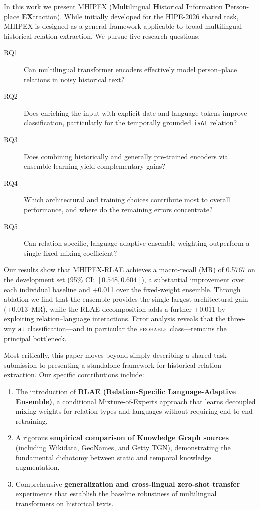 \documentclass[11pt,a4paper]{article}
\begin{document}
In this work we present MHIPEX (\textbf{M}ultilingual \textbf{H}istorical \textbf{I}nformation \textbf{P}erson-place \textbf{EX}traction). While initially developed for the HIPE-2026 shared task, MHIPEX is designed as a general framework applicable to broad multilingual historical relation extraction. We pursue five research questions:

\begin{description}
    \item[RQ1] Can multilingual transformer encoders effectively model person--place relations in noisy historical text?
    \item[RQ2] Does enriching the input with explicit date and language tokens improve classification, particularly for the temporally grounded \texttt{isAt} relation?
    \item[RQ3] Does combining historically and generally pre-trained encoders via ensemble learning yield complementary gains?
    \item[RQ4] Which architectural and training choices contribute most to overall performance, and where do the remaining errors concentrate?
    \item[RQ5] Can relation-specific, language-adaptive ensemble weighting outperform a single fixed mixing coefficient?
\end{description}

Our results show that MHIPEX-RLAE achieves a macro-recall (MR) of 0.5767 on the development set (95\% CI: $[0.548, 0.604]$), a substantial improvement over each individual baseline and +0.011 over the fixed-weight ensemble. Through ablation we find that the ensemble provides the single largest architectural gain (+0.013~MR), while the RLAE decomposition adds a further +0.011 by exploiting relation--language interactions. Error analysis reveals that the three-way \texttt{at} classification---and in particular the \textsc{probable} class---remains the principal bottleneck.

Most critically, this paper moves beyond simply describing a shared-task submission to presenting a standalone framework for historical relation extraction. Our specific contributions include:
\begin{enumerate}
    \item The introduction of \textbf{RLAE (Relation-Specific Language-Adaptive Ensemble)}, a conditional Mixture-of-Experts approach that learns decoupled mixing weights for relation types and languages without requiring end-to-end retraining.
    \item A rigorous \textbf{empirical comparison of Knowledge Graph sources} (including Wikidata, GeoNames, and Getty TGN), demonstrating the fundamental dichotomy between static and temporal knowledge augmentation.
    \item Comprehensive \textbf{generalization and cross-lingual zero-shot transfer} experiments that establish the baseline robustness of multilingual transformers on historical texts.
\end{enumerate}
\end{document}
